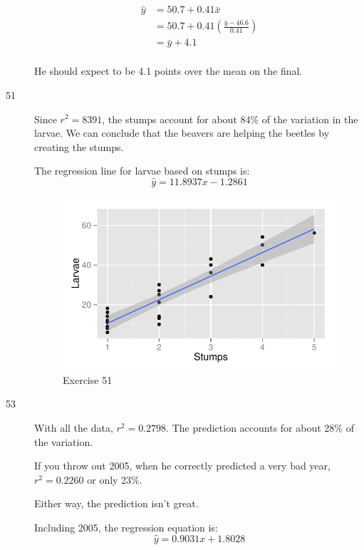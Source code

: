 \documentclass[letterpaper, landscape]{exam}
\begin{document}
\begin{description}
        \begin{align*}
          \hat{y} & = 50.7 + 0.41 \bar{x} \\
                  & = 50.7 + 0.41 \left( \frac{\bar{y} - 46.6}{0.41} \right) \\
                  & = \bar{y} + 4.1 \\
        \end{align*}

        He should expect to be 4.1 points over the mean on the final.

      \item[51]
        Since $r^2 = 8391$, the stumps account for about 84\% of the variation
        in the larvae.  We can conclude that the beavers are helping the beetles
        by creating the stumps.

        The regression line for larvae based on stumps is:
        \[
          \hat{y} = 11.8937 x - 1.2861 
        \]

        \begin{figure}[H]
          \centering
          \includegraphics{figures/ex51.pdf}
          \caption{Exercise 51}
        \end{figure}

      \item[53]
        With all the data, $r^2 = 0.2798$.  The prediction accounts for about
        28\% of the variation.  
        
        If you throw out 2005, when he correctly predicted a very bad year, 
        $r^2 = 0.2260$ or only 23\%.

        Either way, the prediction isn't great.

        Including 2005, the regression equation is:
        \[
          \hat{y} = 0.9031 x + 1.8028
        \]


\end{description}
\end{document}
